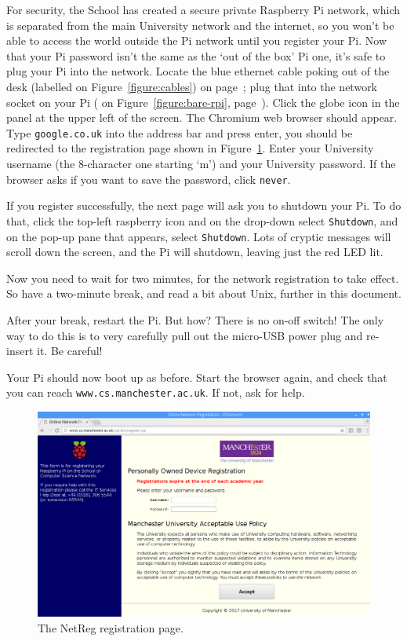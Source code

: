 For security, the School has created a secure private Raspberry Pi
network, which is separated from the main University network and the
internet, so you won't be able to access the world outside the Pi
network until you register your Pi. Now that your Pi password isn't
the same as the `out of the box' Pi one, it's safe to plug your Pi
into the network. Locate the blue ethernet cable poking out of the
desk (labelled \protect{} on Figure~\ref{figure:cables}) on
page~\pageref{figure:cables}; plug that into the network socket on
your Pi ( on Figure~\ref{figure:bare-rpi},
page~\pageref{figure:bare-rpi}). Click the globe icon in the panel at
the upper left of the screen. The Chromium web browser should
appear. Type \verb+google.co.uk+ into the address bar and press enter,
you should be redirected to the registration page shown in
Figure~\ref{figure:netreg}. Enter your University username (the
8-character one starting `m') and your University password. If the
browser asks if you want to save the password, click \verb+never+.

If you register successfully, the next page will ask you to shutdown
your Pi. To do that, click the top-left raspberry icon and on the
drop-down select \verb+Shutdown+, and on the pop-up pane that appears, select \verb+Shutdown+.
Lots of cryptic messages will scroll
down the screen, and the Pi will shutdown, leaving just the red LED lit.

Now you need to wait for two minutes, for the network registration to
take effect. So have a two-minute break, and read a bit about Unix, further in this document.

After your break, restart the Pi. But how? There is no on-off switch!
The only way to do this is to very carefully pull out the micro-USB
power plug and re-insert it. Be careful!

Your Pi should now boot up as before. Start the browser again, and
check that you can reach \verb+www.cs.manchester.ac.uk+. If not, ask for help.

\begin{figure}
\centerline{\includegraphics[width=13cm]{images/NetReg.png}}
\caption{The NetReg registration page.} \label{figure:netreg}
\end{figure}

